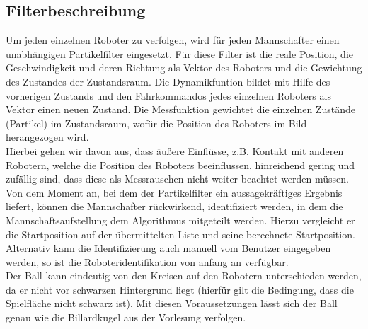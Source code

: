 \documentclass{ezb}
\begin{document}
\subsection{Filterbeschreibung}
Um jeden einzelnen Roboter zu verfolgen, wird für jeden Mannschafter einen unabhängigen Partikelfilter eingesetzt.
Für diese Filter ist die reale Position, die Geschwindigkeit und deren Richtung als Vektor des Roboters und die Gewichtung des Zustandes der Zustandsraum. Die Dynamikfuntion bildet mit Hilfe des vorherigen Zustands und den Fahrkommandos jedes einzelnen Roboters als Vektor einen neuen Zustand. Die Messfunktion gewichtet die einzelnen Zustände (Partikel) im Zustandsraum, wofür die Position des Roboters im Bild herangezogen wird. \\
\linebreak
Hierbei gehen wir davon aus, dass äußere Einflüsse, z.B. Kontakt mit anderen Robotern, welche die Position des Roboters beeinflussen, hinreichend gering und zufällig sind, dass diese als Messrauschen nicht weiter beachtet werden müssen.\\
\linebreak
Von dem Moment an, bei dem der Partikelfilter ein aussagekräftiges Ergebnis liefert, können die Mannschafter rückwirkend, identifiziert werden, in dem die Mannschaftsaufstellung dem Algorithmus mitgeteilt werden. Hierzu vergleicht er die Startposition auf der übermittelten Liste und seine berechnete Startposition. Alternativ kann die Identifizierung auch manuell vom Benutzer eingegeben werden, so ist die Roboteridentifikation von anfang an verfügbar.\\
\linebreak
Der Ball kann eindeutig von den Kreisen auf den Robotern unterschieden werden, da er nicht vor schwarzen Hintergrund liegt (hierfür gilt die Bedingung, dass die Spielfläche nicht schwarz ist). Mit diesen Voraussetzungen lässt sich der Ball genau wie die Billardkugel aus der Vorlesung verfolgen.\\
\linebreak
\end{document}
